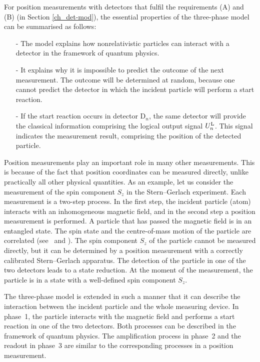 \documentclass[11pt,a4paper]{article}
\begin{document}
For position measurements with detectors that fulfil the requirements (A) and (B) (in Section \ref{ch_det-mod}), the essential properties of the three-phase model can be summarised as follows:  
%
\begin{itemize} 
\item[-] The model explains how nonrelativistic particles can interact with a detector in the framework of quantum physics.  
%
\item[-] It explains why it is impossible to predict the outcome of the next measurement.  The outcome will be determined at random, because one cannot predict the detector in which the incident particle will perform a start reaction.  
%
\item[-]  If the start reaction occurs in detector D$_n$, the same detector will provide the classical information comprising the logical output signal $U_n^{\rm L}$.  This signal indicates the measurement result, comprising the position of the detected particle. 
%
\end{itemize}

Position measurements play an important role in many other measurements.  
This is because of the fact that position coordinates can be measured directly, unlike practically all other physical quantities.  
As an example, let us consider the measurement of the spin component $S_z$ in the Stern--Gerlach experiment.  Each measurement is a two-step process.  
In the first step, the incident particle (atom) interacts with an inhomogeneous magnetic field, and in the second step a position measurement is performed.  
A particle that has passed the magnetic field is in an entangled state.  
The spin state and the centre-of-mass motion of the particle are correlated (see~\cite{Pa58} and \cite{GoYa}).  The spin component $S_z$ of the particle cannot be measured directly, but it can be determined by a position measurement with a correctly calibrated Stern--Gerlach apparatus.  
The detection of the particle in one of the two detectors leads to a state reduction.  At the moment of the measurement, the particle is in a state with a well-defined spin component $S_z$.  

The three-phase model is extended in such a manner that it can describe the interaction between the incident particle and the whole measuring device.  
In phase~1, the particle interacts with the magnetic field and performs a start reaction in one of the two detectors.  
Both processes can be described in the framework of quantum physics.  
The amplification process in phase~2 and the readout in phase~3 are similar to the corresponding processes in a position measurement.  
\end{document}
